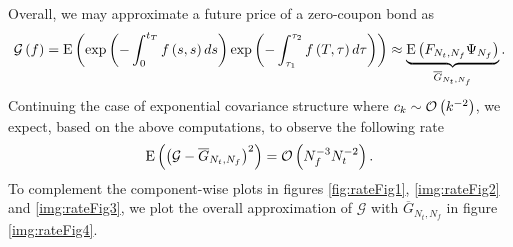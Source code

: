 \documentclass[11pt]{amsart}
\begin{document}
Overall, we may approximate a future price of a zero-coupon bond as
\begin{align*}
\mathcal G \left( {f} \right) =
\mathrm{E} \left( {{\mathrm{exp}\left ( {-\int_0^{t_{T}} f \left( {s,s} \right) ds}\right )\mathrm{exp}\left ( {-\int_{\tau_1}^{\tau_2} f \left( {T,\tau} \right) d\tau}\right )}} \right)
\approx
\underbrace{\mathrm{E} \left( {{
F_{N_t,N_f}
\Psi_{N_f} }} \right)}_{\overline G_{N_t,N_f}}.
\end{align*}
Continuing the case of exponential covariance structure where $c_k \sim \mathcal O \left( {{k^{-2}}} \right)$,
we expect, based on the above computations, to observe the following rate
\begin{align*}
\mathrm{E} \left( {{ \left( {\mathcal G - \overline G_{N_t,N_f}} \right)^2}} \right) = \mathcal O \left( {{N_f^{-3} N_t^{-2}}} \right).
\end{align*} 
To complement the component-wise plots in figures \ref{fig:rateFig1}, \ref{img:rateFig2} and
\ref{img:rateFig3}, we plot the overall approximation of $\mathcal G$ with $\overline G_{N_t,N_f}$
in figure \ref{img:rateFig4}.
\end{document}
